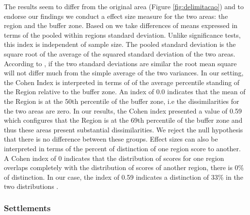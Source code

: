 The results seem to differ from the original area (Figure \ref{fig:delimitacao}) and to endorse our findings we conduct a effect size measure for the two areas: the region and the buffer zone. Based on \citet{COHEN1977} we take differences of means expressed in terms of the pooled within regions standard deviation. Unlike significance tests, this index is independent of sample size. The pooled standard deviation is the square root of the average of the squared standard deviation of the two areas. According to \citet{COHEN1977}, if the two standard deviations are similar the root mean square will not differ much from the simple average of the two variances. In our setting, the Cohen Index is interpreted in terms of of the average percentile standing of the Region relative to the buffer zone. An index of 0.0 indicates that the mean of the Region is at the 50th percentile of the buffer zone, i.e the dissimilarities for the two areas are zero. In our results, the Cohen index presented a value of 0.59 which configures that the Region is at the 69th percentile of the buffer zone and thus these areas present substantial dissimilarities. We reject the null hypothesis that there is no difference between these groups. Effect sizes can also be interpreted in terms of the percent of distinction of one region score to another. A Cohen index of 0 indicates that the distribution of scores for one region overlaps completely with the distribution of scores of another region, there is 0\% of distinction. In our case, the index of 0.59 indicates a distinction of 33\% in the two distributions \citep{COHEN1977}.

\subsubsection{Settlements} \label{resultssection3.1}

